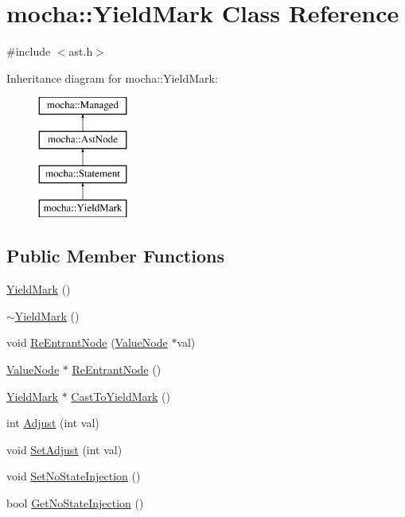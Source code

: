 \hypertarget{classmocha_1_1_yield_mark}{
\section{mocha::YieldMark Class Reference}
\label{classmocha_1_1_yield_mark}
}


{\ttfamily \#include $<$ast.h$>$}

Inheritance diagram for mocha::YieldMark:\begin{figure}[H]
\begin{center}
\leavevmode
\includegraphics[height=4.000000cm]{classmocha_1_1_yield_mark}
\end{center}
\end{figure}
\subsection*{Public Member Functions}
\begin{DoxyCompactItemize}
\item 
\hyperlink{classmocha_1_1_yield_mark_ac21e782327707fa745325b062f1a7a54}{YieldMark} ()
\item 
\hyperlink{classmocha_1_1_yield_mark_a39a0123297eb8449c07662b753dc53ae}{$\sim$YieldMark} ()
\item 
void \hyperlink{classmocha_1_1_yield_mark_a4859663e07a4500339dbc2bb3951ab8b}{ReEntrantNode} (\hyperlink{classmocha_1_1_value_node}{ValueNode} $\ast$val)
\item 
\hyperlink{classmocha_1_1_value_node}{ValueNode} $\ast$ \hyperlink{classmocha_1_1_yield_mark_a74bd1b459c4401fb2c9bc76fddf89cd3}{ReEntrantNode} ()
\item 
\hyperlink{classmocha_1_1_yield_mark}{YieldMark} $\ast$ \hyperlink{classmocha_1_1_yield_mark_ac43d6b11559da52a58847aa567a3e64e}{CastToYieldMark} ()
\item 
int \hyperlink{classmocha_1_1_yield_mark_a065749a765c91638062a858f8b641be5}{Adjust} (int val)
\item 
void \hyperlink{classmocha_1_1_yield_mark_a34137ede79b129a0f59757b65ad9a9a6}{SetAdjust} (int val)
\item 
void \hyperlink{classmocha_1_1_yield_mark_ad652b6e253e6a84204ab2d06a5a6c5d8}{SetNoStateInjection} ()
\item 
bool \hyperlink{classmocha_1_1_yield_mark_a52bd9df832846e6ee8c2479460ec96e9}{GetNoStateInjection} ()
\end{DoxyCompactItemize}
